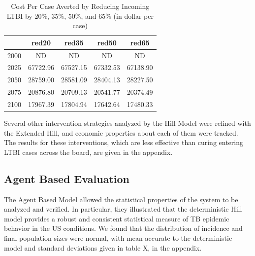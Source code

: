\documentclass{amsart}
\begin{document}
\begin{table}
\centering
\begin{tabular}{|r|cccc|}
  \hline
 & red20 & red35 & red50 & red65 \\ 
  \hline
2000 & ND & ND & ND & ND \\ 
  2025 & 67722.96 & 67527.15 & 67332.53 & 67138.90 \\ 
  2050 & 28759.00 & 28581.09 & 28404.13 & 28227.50 \\ 
  2075 & 20876.80 & 20709.13 & 20541.77 & 20374.49 \\ 
  2100 & 17967.39 & 17804.94 & 17642.64 & 17480.33 \\ 
   \hline
\end{tabular}
\caption{Cost Per Case Averted by Reducing Incoming LTBI by 20\%, 35\%, 50\%, and 65\% (in dollar per case)} 
\label{tab:cpcaRes}
\end{table}
Several other intervention strategies analyzed by the Hill Model were refined
with the Extended Hill, and economic properties about each of them were tracked.
The results for these interventions, which are less effective than curing
entering LTBI cases across the board, are given in the appendix. 
\subsection{Agent Based Evaluation}
The Agent Based Model allowed the statistical properties of the system to be
analyzed and verified. In particular, they illustrated that the deterministic
Hill model provides a robust and consistent statistical measure of TB epidemic
behavior in the US conditions. We found that the distribution of incidence and
final population sizes were normal, with mean accurate to the deterministic
model and standard deviations given in table X, in the appendix. 
\end{document}
